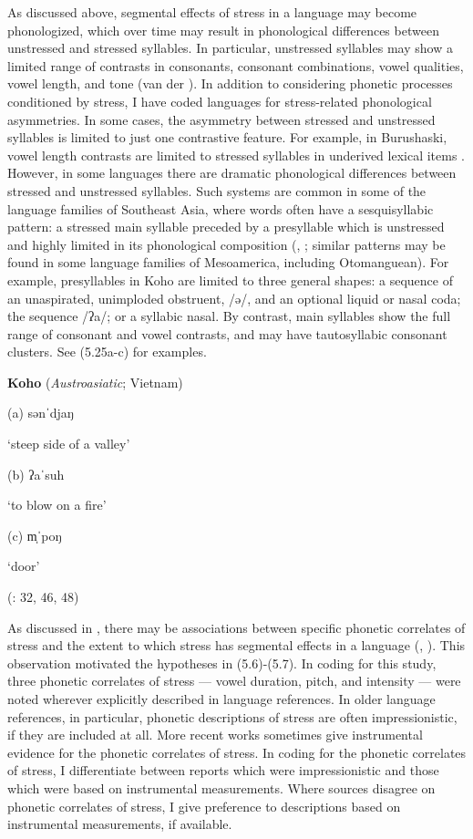   As discussed above, segmental effects of stress in a language may become phonologized, which over time may result in phonological differences between unstressed and stressed syllables. In particular, unstressed syllables may show a limited range of contrasts in consonants, consonant combinations, vowel qualities, vowel length, and tone (van der \citealt{Hulst2010}). In addition to considering phonetic processes conditioned by stress, I have coded languages for stress-related phonological asymmetries. In some cases, the asymmetry between stressed and unstressed syllables is limited to just one contrastive feature. For example, in Burushaski, vowel length contrasts are limited to stressed syllables in underived lexical items \citep[1028]{Anderson1997}. However, in some languages there are dramatic phonological differences between stressed and unstressed syllables. Such systems are common in some of the language families of Southeast Asia, where words often have a sesquisyllabic pattern: a stressed main syllable preceded by a presyllable which is unstressed and highly limited in its phonological composition (\citealt{Matisoff1973}, \citealt{Michaud2012}; similar patterns may be found in some language families of Mesoamerica, including Otomanguean). For example, presyllables in Koho are limited to three general shapes: a sequence of an unaspirated, unimploded obstruent, /ə/, and an optional liquid or nasal coda; the sequence /ʔa/; or a syllabic nasal. By contrast, main syllables show the full range of consonant and vowel contrasts, and may have tautosyllabic consonant clusters. See (5.25a-c) for examples.

\ea\label{ex:(5.25)}
  \textbf{Koho} (\textit{Austroasiatic}; Vietnam)

(a)  sənˈdjaŋ

‘steep side of a valley’

(b)  ʔaˈsuh

‘to blow on a fire’

(c)  m̩ˈpoŋ

‘door’

(\citealt{Olsen2014}: 32, 46, 48)

\z

  As discussed in , there may be associations between specific phonetic correlates of stress and the extent to which stress has segmental effects in a language (\citealt{BybeeEtAl1998}, \citealt{Schiering2007}). This observation motivated the hypotheses in (5.6)-(5.7). In coding for this study, three phonetic correlates of stress — vowel duration, pitch, and intensity — were noted wherever explicitly described in language references. In older language references, in particular, phonetic descriptions of stress are often impressionistic, if they are included at all. More recent works sometimes give instrumental evidence for the phonetic correlates of stress. In coding for the phonetic correlates of stress, I differentiate between reports which were impressionistic and those which were based on instrumental measurements. Where sources disagree on phonetic correlates of stress, I give preference to descriptions based on instrumental measurements, if available.

